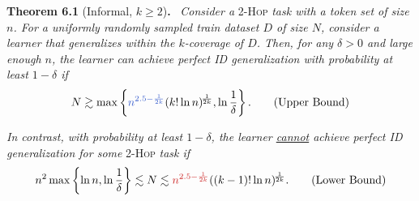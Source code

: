 \documentclass[10pt]{article}
\begin{document}
\noindent\textbf{Theorem 6.1} (Informal, $k\ge 2$)\textbf{.}~
\textit{Consider a} \textsc{2-Hop} \textit{task with a token set of size~$n$. For a uniformly randomly sampled train dataset $D$ of size $N$, consider a learner that generalizes within the $k$-coverage of $D$. Then, for any $\delta > 0$ and large enough $n$, the learner can achieve perfect ID generalization with probability at least $1-\delta$ if}
\vspace{-10pt}
\begin{align*}
N \gtrsim \max\left\{ \textcolor{RoyalBlue3}{n^{2.5 - \frac{1}{2k}}} (k! \ln n)^{\!\frac{1}{2k}}, \ln\frac1\delta \right\}. \tag{Upper Bound}
\end{align*}
\vspace{-10pt}

\noindent\textit{In contrast, with probability at least $1-\delta$, the learner \underline{cannot} achieve perfect ID generalization for some} \textsc{2-Hop} \textit{task if}
\vspace{-10pt}
\begin{align*}
n^2 \max \left\{\ln n, \ln\frac1\delta\right\} \lesssim N \lesssim \textcolor{Firebrick3}{n^{2.5 - \frac{1}{2k}}} ((k-1)! \ln n)^{\!\frac{1}{2k}}. \tag{Lower Bound}
\end{align*}
\end{document}

